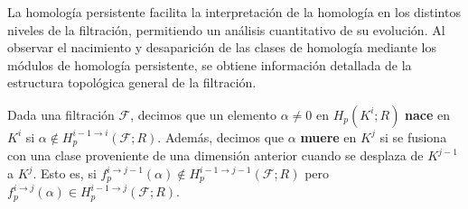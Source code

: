 %	

La homología persistente facilita la interpretación de la homología en los distintos niveles de la filtración, permitiendo un análisis cuantitativo de su evolución. Al observar el nacimiento y desaparición de las clases de homología mediante los módulos de homología persistente, se obtiene información detallada de la estructura topológica general de la filtración.

\begin{definicion}
	Dada una filtración \(\mathcal{F}\), decimos que un elemento \(\alpha \neq 0\) en \(H_p(K^i;R)\) \textbf{nace} en \(K^i\) si \(\alpha \not\in H_{p}^{i-1 \to i}(\mathcal{F};R)\). Además, decimos que \(\alpha\) \textbf{muere} en \(K^j\) si se fusiona con una clase proveniente de una dimensión anterior cuando se desplaza de \(K^{j-1}\) a \(K^{j}\). Esto es, si \(f^{i \to j-1}_p(\alpha) \not\in H_{p}^{i-1 \to j-1}(\mathcal{F};R)\) pero \(f^{i \to j}_p(\alpha) \in H_{p}^{i-1 \to j}(\mathcal{F};R)\).
\end{definicion}

